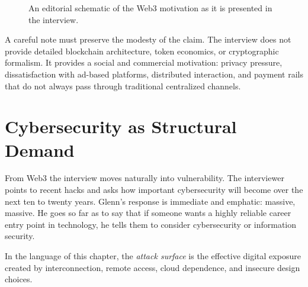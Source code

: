 \begin{figure}[h]
\centering
{}
\caption{An editorial schematic of the Web3 motivation as it is presented in the interview.}
\end{figure}

A careful note must preserve the modesty of the claim. The interview does not provide detailed blockchain architecture, token economics, or cryptographic formalism. It provides a social and commercial motivation: privacy pressure, dissatisfaction with ad-based platforms, distributed interaction, and payment rails that do not always pass through traditional centralized channels.

\section{Cybersecurity as Structural Demand}

From Web3 the interview moves naturally into vulnerability. The interviewer points to recent hacks and asks how important cybersecurity will become over the next ten to twenty years. Glenn's response is immediate and emphatic: massive, massive. He goes so far as to say that if someone wants a highly reliable career entry point in technology, he tells them to consider cybersecurity or information security.

\begin{definition}
In the language of this chapter, the \emph{attack surface} is the effective digital exposure created by interconnection, remote access, cloud dependence, and insecure design choices.
\end{definition}

